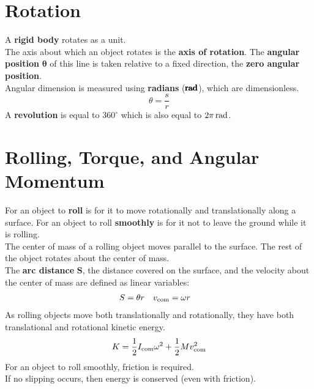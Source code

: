 \documentclass[../AP_Physics_C.tex]{subfiles}
\begin{document}
	\section{Rotation}
		A \textbf{rigid body} rotates as a unit. \\
		The axis about which an object rotates is the \textbf{axis of rotation}. The \textbf{angular position} $\pmb{\theta}$ of this line is taken relative to a fixed direction, the \textbf{zero angular position}. \\
		Angular dimension is measured using \textbf{radians} ($\pmb{\operatorname{\mathrm{rad}}}$), which are dimensionless.
		$$\theta = \frac{s}{r}$$
		A \textbf{revolution} is equal to $360^\circ$ which is also equal to $2\pi\operatorname{\mathrm{rad}}$.
	\section{Rolling, Torque, and Angular Momentum}
		For an object to \textbf{roll} is for it to move rotationally and translationally along a surface. For an object to roll \textbf{smoothly} is for it not to leave the ground while it is rolling. \\
		The center of mass of a rolling object moves parallel to the surface. The rest of the object rotates about the center of mass. \\
		The \textbf{arc distance} $\pmb{S}$, the distance covered on the surface, and the velocity about the center of mass are defined as linear variables:
		\begin{align*}
			S &= \theta r & v_{\mathrm{com}} &= \omega r
		\end{align*}
		As rolling objects move both translationally and rotationally, they have both translational and rotational kinetic energy.
		$$K = \frac{1}{2}I_{\mathrm{com}}\omega^2 + \frac{1}{2}Mv_{\mathrm{com}}^2$$
		For an object to roll smoothly, friction is required. \\
		If no slipping occurs, then energy is conserved (even with friction).
\end{document}
